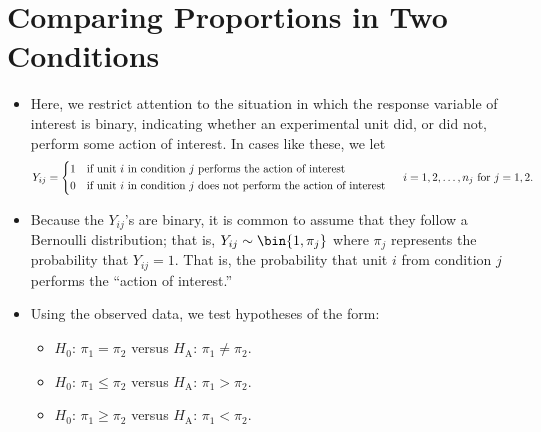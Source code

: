 \section{Comparing Proportions in Two Conditions}
\begin{itemize}
      \item Here, we restrict attention to the situation in which the response variable of interest
            is binary, indicating whether an experimental unit did, or did not, perform
            some action of interest. In cases like these, we let
            \[ Y_{ij}=\begin{cases*}
                        1 & if unit $ i $ in condition $ j $ performs the action of interest         \\
                        0 & if unit $ i $ in condition $ j $ does not perform the action of interest
                  \end{cases*}\quad i=1,2,\ldots,n_j\text{ for } j=1,2. \]
      \item Because the $ Y_{ij} $'s are binary, it is common to assume that they follow
            a Bernoulli distribution; that is, $ Y_{ij}\sim \bin{1,\pi_j} $ where
            $ \pi_j $ represents the probability that $ Y_{ij}=1 $. That is,
            the probability that unit $ i $ from condition $ j $ performs the ``action of interest.''
      \item Using the observed data, we test hypotheses of the form:
            \begin{itemize}
                  \item $ H_0 $: $ \pi_1=\pi_2 $ versus $ H_\text{A} $: $ \pi_1\ne\pi_2 $.
                  \item $ H_0 $: $ \pi_1\le\pi_2 $ versus $ H_\text{A} $: $ \pi_1>\pi_2 $.
                  \item $ H_0 $: $ \pi_1\ge\pi_2 $ versus $ H_\text{A} $: $ \pi_1<\pi_2 $.
            \end{itemize}
\end{itemize}
